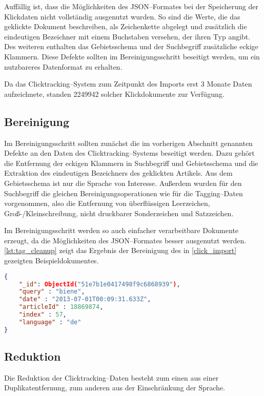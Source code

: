 Auffällig ist, dass die Möglichkeiten des JSON--Formates bei der Speicherung der Klickdaten nicht vollständig ausgenutzt wurden. So sind die Werte, die das geklickte Dokument beschreiben, als Zeichenkette abgelegt und zusätzlich die eindeutigen Bezeichner mit einem Buchstaben versehen, der ihren Typ angibt. Des weiteren enthalten  das Gebietsschema und der Suchbegriff zusätzliche eckige Klammern. Diese Defekte sollten im Bereinigungsschritt beseitigt werden, um ein nutzbareres Datenformat zu erhalten.

Da das Clicktracking--System zum Zeitpunkt des Imports erst 3 Monate Daten aufzeichnete, standen \num{2249942} solcher Klickdokumente zur Verfügung.

\subsection{Bereinigung}

Im Bereinigungsschritt sollten zunächst die im vorherigen Abschnitt genannten Defekte an den Daten des Clicktracking--Systems beseitigt werden. Dazu gehört die Entfernung der eckigen Klammern in Suchbegriff und Gebietsschema und die Extraktion des eindeutigen Bezeichners des geklickten Artikels. Aus dem Gebietsschema ist nur die Sprache von Interesse. Außerdem wurden für den Suchbegriff die gleichen Bereinigungsoperationen wie für die Tagging--Daten vorgenommen, also die Entfernung von überflüssigen Leerzeichen, Groß-/Kleinschreibung, nicht druckbarer Sonderzeichen und Satzzeichen.

Im Bereinigungsschritt werden so auch einfacher verarbeitbare Dokumente erzeugt, da die Möglichkeiten des JSON--Formates besser ausgenutzt werden. \cref{lst:tag_cleanup} zeigt das Ergebnis der Bereinigung des in \cref{click_import} gezeigten Beispieldokumentes.

\begin{lstlisting}[language=json, label={lst:tag_cleanup}, caption={JSON--Beispiel für die Bereinigung der Clicktracking--Dokumente}, float]
{
    "_id": ObjectId("51e7b1e0417498f9c6868939"),
    "query" : "biene",
    "date" : "2013-07-01T00:09:31.633Z",
    "articleId" : 18869874,
    "index" : 57,
    "language" : "de"
}
\end{lstlisting}

\subsection{Reduktion}

Die Reduktion der Clicktracking--Daten besteht zum einen aus einer Duplikatentfernung, zum anderen aus der Einschränkung der Sprache.

